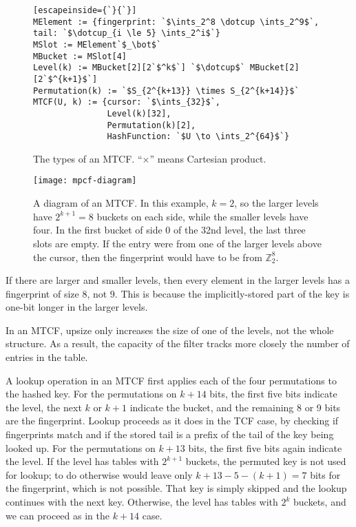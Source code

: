 \documentclass[manuscript,screen,review]{acmart}
\newcommand{\ints}{\mathbb{Z}}
\newcommand{\dotcup}{\ensuremath{\mathaccent\cdot\cup}}
\begin{document}
\begin{figure}

\begin{lstlisting}[escapeinside={`}{`}]
MElement := {fingerprint: `$\ints_2^8 \dotcup \ints_2^9$`, tail: `$\dotcup_{i \le 5} \ints_2^i$`}
MSlot := MElement`$_\bot$`
MBucket := MSlot[4]
Level(k) := MBucket[2][2`$^k$`] `$\dotcup$` MBucket[2][2`$^{k+1}$`]
Permutation(k) := `$S_{2^{k+13}} \times S_{2^{k+14}}$`
MTCF(U, k) := {cursor: `$\ints_{32}$`,
               Level(k)[32],
               Permutation(k)[2],
               HashFunction: `$U \to \ints_2^{64}$`}

\end{lstlisting}
\caption{The types of an MTCF.
``$\times$'' means Cartesian product.
}

\end{figure}


\begin{figure}
  \texttt{[image: mpcf-diagram]}
\caption{\label{mtcf-diagram}
A diagram of an MTCF.
In this example, $k = 2$, so the larger levels have $2^{k+1} = 8$ buckets on each side, while the smaller levels have four.
In the first bucket of side 0 of the 32nd level, the last three slots are empty.
If the entry were from one of the larger levels above the cursor, then the fingerprint would have to be from $\ints_2^8$.
}

\end{figure}

If there are larger and smaller levels, then every element in the larger levels has a fingerprint of size 8, not 9.
This is because the implicitly-stored part of the key is one-bit longer in the larger levels.

In an MTCF, upsize only increases the size of one of the levels, not the whole structure.
As a result, the capacity of the filter tracks more closely the number of entries in the table.

A lookup operation in an MTCF first applies each of the four permutations to the hashed key.
For the permutations on $k + 14$ bits, the first five bits indicate the level, the next $k$ or $k+1$ indicate the bucket, and the remaining 8 or 9 bits are the fingerprint.
Lookup proceeds as it does in the TCF case, by checking if fingerprints match and if the stored tail is a prefix of the tail of the key being looked up.
For the permutations on $k + 13$ bits, the first five bits again indicate the level.
If the level has tables with $2^{k+1}$ buckets, the permuted key is not used for lookup; to do otherwise would leave only $k+13 - 5 - (k+1) = 7$ bits for the fingerprint, which is not possible.
That key is simply skipped and the lookup continues with the next key. %
Otherwise, the level has tables with $2^k$ buckets, and we can proceed as in the $k+14$ case.
\end{document}
